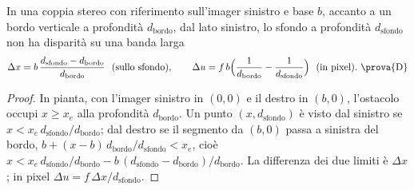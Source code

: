 \begin{proposizione}\label{prop:geo-banda}
In una coppia stereo con riferimento sull'imager sinistro e base $b$, accanto a un bordo verticale a profondità $d_{\mathrm{bordo}}$, dal lato sinistro, lo sfondo a profondità $d_{\mathrm{sfondo}}$ non ha disparità su una banda larga
\begin{equation}\label{eq:geo-banda}
\Delta x=b\,\frac{d_{\mathrm{sfondo}}-d_{\mathrm{bordo}}}{d_{\mathrm{bordo}}}\ \ \text{(sullo sfondo)},\qquad \Delta u=f\,b\Bigl(\frac1{d_{\mathrm{bordo}}}-\frac1{d_{\mathrm{sfondo}}}\Bigr)\ \ \text{(in pixel)}.\ \text{\prova{D}}
\end{equation}
\end{proposizione}
\begin{proof}
In pianta, con l'imager sinistro in $(0,0)$ e il destro in $(b,0)$, l'ostacolo occupi $x\ge x_e$ alla profondità $d_{\mathrm{bordo}}$. Un punto $(x,d_{\mathrm{sfondo}})$ è visto dal sinistro se $x<x_e\,d_{\mathrm{sfondo}}/d_{\mathrm{bordo}}$; dal destro se il segmento da $(b,0)$ passa a sinistra del bordo, $b+(x-b)\,d_{\mathrm{bordo}}/d_{\mathrm{sfondo}}<x_e$, cioè $x<x_e\,d_{\mathrm{sfondo}}/d_{\mathrm{bordo}}-b\,(d_{\mathrm{sfondo}}-d_{\mathrm{bordo}})/d_{\mathrm{bordo}}$. La differenza dei due limiti è $\Delta x$; in pixel $\Delta u=f\,\Delta x/d_{\mathrm{sfondo}}$.
\end{proof}

